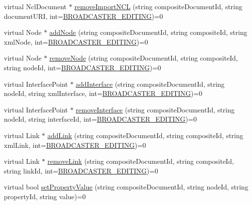 \begin{DoxyCompactItemize}
virtual NclDocument $\ast$ \hyperlink{classbr_1_1ufscar_1_1lince_1_1ginga_1_1wac_1_1editing_1_1IFormatterAdapter_a14823ca74a5d4abaf1fe46667a1444a4}{removeImportNCL} (string compositeDocumentId, string documentURI, int=\hyperlink{classbr_1_1ufscar_1_1lince_1_1ginga_1_1wac_1_1editing_1_1IFormatterAdapter_a60586f9a11e5cefcfecef9386c28d4bd}{BROADCASTER\_\-EDITING})=0
\item 
virtual Node $\ast$ \hyperlink{classbr_1_1ufscar_1_1lince_1_1ginga_1_1wac_1_1editing_1_1IFormatterAdapter_a02b1184b86e58e83ea0d7efd8d6a0afa}{addNode} (string compositeDocumentId, string compositeId, string xmlNode, int=\hyperlink{classbr_1_1ufscar_1_1lince_1_1ginga_1_1wac_1_1editing_1_1IFormatterAdapter_a60586f9a11e5cefcfecef9386c28d4bd}{BROADCASTER\_\-EDITING})=0
\item 
virtual Node $\ast$ \hyperlink{classbr_1_1ufscar_1_1lince_1_1ginga_1_1wac_1_1editing_1_1IFormatterAdapter_a13c6761d64d836b7ddf83df6aa435455}{removeNode} (string compositeDocumentId, string compositeId, string nodeId, int=\hyperlink{classbr_1_1ufscar_1_1lince_1_1ginga_1_1wac_1_1editing_1_1IFormatterAdapter_a60586f9a11e5cefcfecef9386c28d4bd}{BROADCASTER\_\-EDITING})=0
\item 
virtual InterfacePoint $\ast$ \hyperlink{classbr_1_1ufscar_1_1lince_1_1ginga_1_1wac_1_1editing_1_1IFormatterAdapter_ad7ba323796468d38356e6fe8a22b2f89}{addInterface} (string compositeDocumentId, string nodeId, string xmlInterface, int=\hyperlink{classbr_1_1ufscar_1_1lince_1_1ginga_1_1wac_1_1editing_1_1IFormatterAdapter_a60586f9a11e5cefcfecef9386c28d4bd}{BROADCASTER\_\-EDITING})=0
\item 
virtual InterfacePoint $\ast$ \hyperlink{classbr_1_1ufscar_1_1lince_1_1ginga_1_1wac_1_1editing_1_1IFormatterAdapter_a55d4af395d4f71bf1976fc9e08f8488a}{removeInterface} (string compositeDocumentId, string nodeId, string interfaceId, int=\hyperlink{classbr_1_1ufscar_1_1lince_1_1ginga_1_1wac_1_1editing_1_1IFormatterAdapter_a60586f9a11e5cefcfecef9386c28d4bd}{BROADCASTER\_\-EDITING})=0
\item 
virtual Link $\ast$ \hyperlink{classbr_1_1ufscar_1_1lince_1_1ginga_1_1wac_1_1editing_1_1IFormatterAdapter_a9bb5ece52056e1837268b92f100573d1}{addLink} (string compositeDocumentId, string compositeId, string xmlLink, int=\hyperlink{classbr_1_1ufscar_1_1lince_1_1ginga_1_1wac_1_1editing_1_1IFormatterAdapter_a60586f9a11e5cefcfecef9386c28d4bd}{BROADCASTER\_\-EDITING})=0
\item 
virtual Link $\ast$ \hyperlink{classbr_1_1ufscar_1_1lince_1_1ginga_1_1wac_1_1editing_1_1IFormatterAdapter_a50258960e9a5f4405e249e58aa2fa109}{removeLink} (string compositeDocumentId, string compositeId, string linkId, int=\hyperlink{classbr_1_1ufscar_1_1lince_1_1ginga_1_1wac_1_1editing_1_1IFormatterAdapter_a60586f9a11e5cefcfecef9386c28d4bd}{BROADCASTER\_\-EDITING})=0
\item 
virtual bool \hyperlink{classbr_1_1ufscar_1_1lince_1_1ginga_1_1wac_1_1editing_1_1IFormatterAdapter_ad7074b5bc22a8efe7a8d7a20fdb8231e}{setPropertyValue} (string compositeDocumentId, string nodeId, string propertyId, string value)=0
\end{DoxyCompactItemize}
